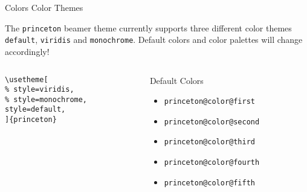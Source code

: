 \documentclass[aspectratio=169]{beamer}
\begin{document}
\begin{frame}[t,fragile]{Colors }{Color Themes}

The \texttt{princeton} beamer theme currently supports three different color themes \texttt{default}, \texttt{viridis} and \texttt{monochrome}. Default colors and color palettes will change accordingly!

\begin{columns}[T]
  \begin{column}{.33\textwidth}
    \begin{example}
\begin{lstlisting}
\usetheme[
% style=viridis,
% style=monochrome,
style=default,
]{princeton}
\end{lstlisting}
    \end{example}
  \end{column}
  
  \begin{column}{.33\textwidth}
    \begin{block}{Default Colors}
      \begin{itemize}
      \item \textcolor{princeton@color@first}{\texttt{princeton@color@first}}
      \item \textcolor{princeton@color@second}{\texttt{princeton@color@second}}
      \item \textcolor{princeton@color@third}{\texttt{princeton@color@third}}
      \item \textcolor{princeton@color@fourth}{\texttt{princeton@color@fourth}}
      \item \textcolor{princeton@color@fifth}{\texttt{princeton@color@fifth}}
      \end{itemize}
    \end{block}
  \end{column}


\end{columns}
\end{frame}
\end{document}
